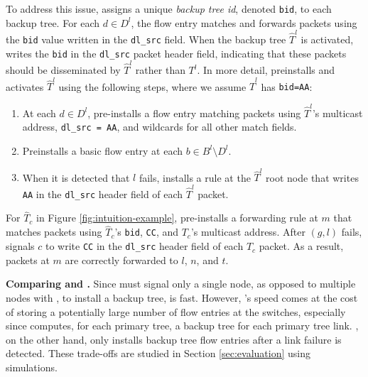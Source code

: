 To address this issue, \pre assigns a unique \emph{backup tree id}, denoted {\tt bid}, to each backup tree.  For each $d \in D^l$, the flow entry matches and forwards packets
using the {\tt bid} value written in the {\tt dl\_src} field. When the backup tree $\hat{T}^l$ is activated, \pre writes the {\tt bid} in the
{\tt dl\_src} packet header field, indicating that these packets should be disseminated by $\hat{T}^l$ rather than $T^l$.
In more detail, \pre preinstalls and activates $\hat{T}^l$ using the following steps, where we assume $\hat{T}^l$ has {\tt bid=AA}:
\begin{enumerate}
	
	\item At each $d \in D^l$, \pre pre-installs a flow entry matching packets using $\hat{T}^l$'s multicast address, {\tt dl\_src = AA}, and wildcards for all other match fields. 
	
	\item Preinstalls a basic flow entry at each $b \in B^l \setminus D^l$.

	\item When it is detected that $l$ fails, \pre installs a rule at the $\hat{T}^l$ root node that writes {\tt AA} in the {\tt dl\_src} header field of each $\hat{T}^l$ packet.
\end{enumerate}

For $\hat{T}_c$ in Figure \ref{fig:intuition-example}, \pre pre-installs a forwarding rule at $m$ that matches packets using $\hat{T}_c$'s {\tt bid}, {\tt CC}, and $T_c$'s multicast 
address.  After $(g,l)$ fails, \pre signals $c$ to write {\tt CC} in the {\tt dl\_src} header field of each $\hat{T}_c$ packet.  As a result, packets at $m$ are correctly forwarded to $l$,
$n$, and $t$.

{\bf Comparing \pre and \posts.}
Since \pre must signal only a single node, as opposed to multiple nodes with \posts, to install a backup tree, \pre is fast. However, \pres's speed comes at the cost of 
storing a potentially large number of flow entries at the switches, especially since \mdr computes, for each primary tree, a backup tree for each primary tree link. \post, on the other hand,
only installs backup tree flow entries after a link failure is detected.
These trade-offs are studied in Section \ref{sec:evaluation} using simulations.

